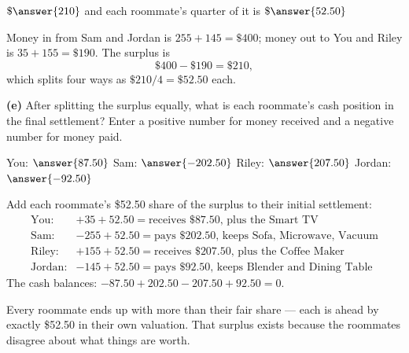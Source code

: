 \documentclass[12pt]{ximera}
\begin{document}
\begin{problem}
\begin{prompt}
$\$\answer{210}$ \qquad and each roommate's quarter of it is $\$\answer{52.50}$

\begin{feedback}
Money in from Sam and Jordan is $255 + 145 = \$400$; money out to You and Riley is
$35 + 155 = \$190$. The surplus is
\[ \$400 - \$190 = \$210, \]
which splits four ways as $\$210/4 = \$52.50$ each.
\end{feedback}
\end{prompt}

\begin{prompt}
\textbf{(e)} After splitting the surplus equally, what is each roommate's cash position
in the final settlement? Enter a positive number for money received and a negative
number for money paid.

You: $\answer{87.50}$ \quad Sam: $\answer{-202.50}$ \quad Riley: $\answer{207.50}$ \quad
Jordan: $\answer{-92.50}$

\begin{feedback}
Add each roommate's \$52.50 share of the surplus to their initial settlement:
\[
\begin{array}{ll}
\text{You}: & +35 + 52.50 = \text{receives } \$87.50 \text{, plus the Smart TV}\\
\text{Sam}: & -255 + 52.50 = \text{pays } \$202.50 \text{, keeps Sofa, Microwave, Vacuum}\\
\text{Riley}: & +155 + 52.50 = \text{receives } \$207.50 \text{, plus the Coffee Maker}\\
\text{Jordan}: & -145 + 52.50 = \text{pays } \$92.50 \text{, keeps Blender and Dining Table}
\end{array}
\]
The cash balances: $-87.50 + 202.50 - 207.50 + 92.50 = 0$. \checkmark

Every roommate ends up with more than their fair share --- each is ahead by exactly
\$52.50 in their own valuation. That surplus exists because the roommates disagree
about what things are worth.
\end{feedback}
\end{prompt}
\end{problem}
\end{document}
